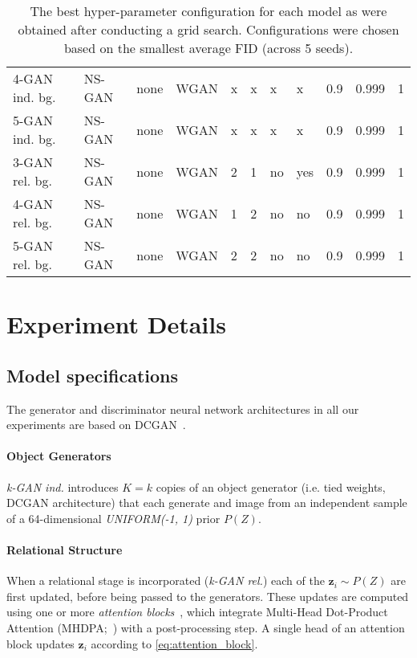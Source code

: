 \documentclass{article}
\begin{document}
\begin{table}[h]
\begin{tabular}{llllllllrrr}
 4-GAN ind. bg. &   NS-GAN &        none &    WGAN &      x &     x &  x &        x &    0.9 &  0.999 &       1 \\
 5-GAN ind. bg. &   NS-GAN &        none &    WGAN &      x &     x &  x &       x &    0.9 &  0.999 &       1 \\
 3-GAN rel. bg. &   NS-GAN &        none &    WGAN &      2 &     1 &  no &        yes &    0.9 &  0.999 &       1 \\
 4-GAN rel. bg. &   NS-GAN &        none &    WGAN &      1 &     2 &  no &       no &    0.9 &  0.999 &       1 \\
 5-GAN rel. bg. &   NS-GAN &        none &    WGAN &      2 &     2 &  no &       no &    0.9 &  0.999 &       1 \\
\bottomrule
\end{tabular}
\caption{The best hyper-parameter configuration for each model as were obtained after conducting a grid search.
Configurations were chosen based on the smallest average FID (across 5 seeds).}
\label{table:best_models}
\end{table}

\newpage
\section{Experiment Details}
\label{app:experiment_details}
\subsection{Model specifications}
The generator and discriminator neural network architectures in all our experiments are based on DCGAN~\citep{radford2015unsupervised}.

\paragraph{Object Generators}\emph{k-GAN ind.} introduces $K=k$ copies of an object generator (i.e. tied weights, DCGAN architecture) that each generate and image from an independent sample of a 64-dimensional \emph{UNIFORM(-1, 1)} prior $P(Z)$.

\paragraph{Relational Structure}
When a relational stage is incorporated (\emph{k-GAN rel.}) each of the $\bm{z}_i \sim P(Z)$ are first updated, before being passed to the generators.
These updates are computed using one or more \emph{attention blocks}~\citep{zambaldi2018relational}, which integrate Multi-Head Dot-Product Attention (MHDPA;~\cite{vaswani2017attention}) with a post-processing step.
A single head of an attention block updates $\bm{z}_i$ according to \eqref{eq:attention_block}.
\end{document}
